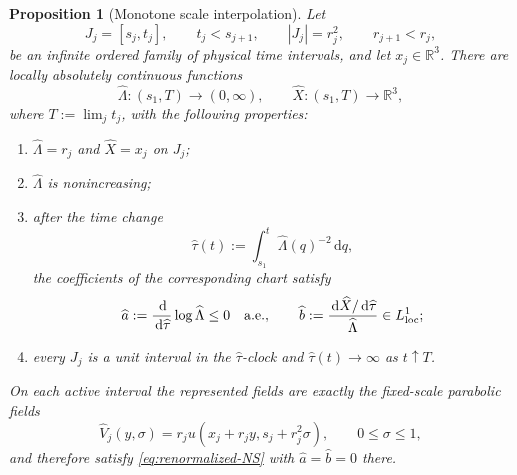 \documentclass[11pt]{amsart}
\numberwithin{equation}{section}
\theoremstyle{plain}
\newtheorem{proposition}[proposition]{Proposition}
\theoremstyle{definition}
\theoremstyle{remark}
\newcommand{\R}{\mathbb R}
\newcommand{\dd}{\,\mathrm d}
\begin{document}
\begin{proposition}[Monotone scale interpolation]
\label{prop:monotone-scale-interpolation}
Let
\[
 J_j=[s_j,t_j],\qquad
 t_j<s_{j+1},\qquad
 |J_j|=r_j^2,
 \qquad r_{j+1}<r_j,
 \]
be an infinite ordered family of physical time intervals, and let
\(x_j\in\R^3\).  There are locally absolutely continuous functions
\[
 \widehat\Lambda:(s_1,T)\to(0,\infty),
 \qquad
 \widehat X:(s_1,T)\to\R^3,
 \]
where \(T:=\lim_jt_j\), with the following properties:
\begin{enumerate}[label=\textup{(\roman*)},leftmargin=2.2em]
\item \(\widehat\Lambda=r_j\) and \(\widehat X=x_j\) on \(J_j\);
\item \(\widehat\Lambda\) is nonincreasing;
\item after the time change
\begin{equation}\label{eq:monotone-chart-clock}
 \widehat\tau(t):=
 \int_{s_1}^{t}\widehat\Lambda(q)^{-2}\dd q,
\end{equation}
the coefficients of the corresponding chart satisfy
\begin{equation}\label{eq:monotone-chart-coefficients}
 \widehat a:=\frac{\dd}{\dd\widehat\tau}
                 \log\widehat\Lambda\le0
 \quad\hbox{a.e.},
 \qquad
 \widehat b:=\frac{\dd\widehat X/\dd\widehat\tau}
                  {\widehat\Lambda}
 \in L^1_{\mathrm{loc}};
\end{equation}
\item every \(J_j\) is a unit interval in the
\(\widehat\tau\)-clock and \(\widehat\tau(t)\to\infty\) as
\(t\uparrow T\).
\end{enumerate}
On each active interval the represented fields are exactly the fixed-scale
parabolic fields
\begin{equation}\label{eq:monotone-active-fields}
 \widehat V_j(y,\sigma)
 =r_j u(x_j+r_jy,s_j+r_j^2\sigma),
 \qquad 0\le\sigma\le1,
\end{equation}
and therefore satisfy \eqref{eq:renormalized-NS} with
\(\widehat a=\widehat b=0\) there.
\end{proposition}
\end{document}
